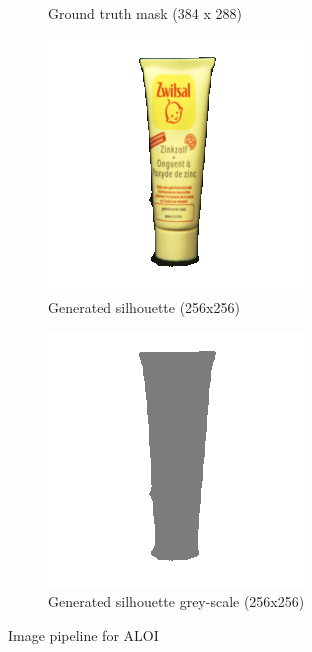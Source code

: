 \documentclass{article}
\begin{document}
\begin{figure}[h!]
\begin{subfigure}{0.23\textwidth}
    \caption{Ground truth mask (384 x 288)}
    \label{moistmask}
  \end{subfigure}
  \hfill
  \begin{subfigure}{0.23\textwidth}
    \centering
    \includegraphics[width=\textwidth]{images/moisturisersil.png}
    \caption{Generated silhouette (256x256)}
    \label{moistsil}
  \end{subfigure}
  \hfill
  \begin{subfigure}{0.23\textwidth}
    \centering
    \includegraphics[width=\textwidth]{images/moisturisersilgrey.png}
    \caption{Generated silhouette grey-scale (256x256)}
    \label{moistsilgrey}
  \end{subfigure}
  \caption{Image pipeline for ALOI}
  \label{datapipeline}
\end{figure}
\end{document}
